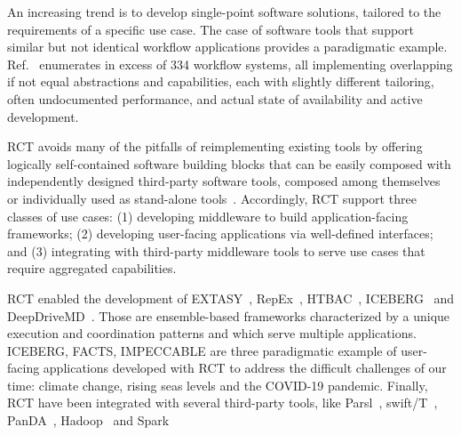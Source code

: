 \documentclass[preprint,12pt, a4paper]{elsarticle}
\begin{document}


An increasing trend is to develop single-point software solutions, tailored to
the requirements of a specific use case. The case of software tools that support
similar but not identical workflow applications provides a paradigmatic example.
Ref.~\cite{workflow-systems-url} enumerates in excess of 334 workflow systems,
all implementing overlapping if not equal abstractions and capabilities, each
with slightly different tailoring, often undocumented performance, and actual
state of availability and active development.

RCT avoids many of the pitfalls of reimplementing existing tools by offering
logically self-contained software building blocks that can be easily composed
with independently designed third-party software tools, composed among
themselves or individually used as stand-alone
tools~\cite{turilli2019middleware}. Accordingly, RCT support three classes of
use cases: (1) developing middleware to build application-facing frameworks; (2)
developing user-facing applications via well-defined interfaces; and (3)
integrating with third-party middleware tools to serve use cases that require
aggregated capabilities.


RCT enabled the development of EXTASY~\cite{balasubramanian2016extasy},
RepEx~\cite{treikalis2016repex}, HTBAC~\cite{dakka2018high},
ICEBERG~\cite{iceberg_paper} and DeepDriveMD~\cite{lee2019deepdrivemd}. Those
are ensemble-based frameworks
characterized by a unique execution and coordination patterns and which serve
multiple applications. ICEBERG, FACTS, IMPECCABLE are three paradigmatic example
of user-facing applications developed with RCT to address the difficult
challenges of our time: climate change, rising seas levels and the COVID-19
pandemic. Finally, RCT have been integrated with several third-party tools, like
Parsl~\cite{alsaadi2021radical}, swift/T~\cite{turilli2017evaluating},
PanDA~\cite{merzky2019panda}, Hadoop~\cite{luckow2016hadoop} and
Spark~\cite{paraskevakos2018task}
\end{document}
